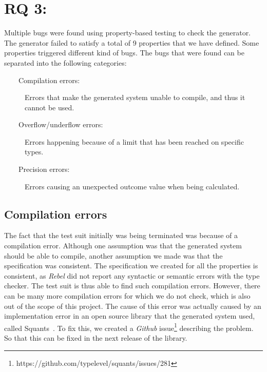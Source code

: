\section{RQ 3: \rqThree{}}
Multiple bugs were found using property-based testing to check the generator. The generator failed to satisfy a total of 9 properties that we have defined. Some properties triggered different kind of bugs. The bugs that were found can be separated into the following categories:
\begin{description}
  \item[~~~~Compilation errors:] Errors that make the generated system unable to compile, and thus it cannot be used.
  \item[~~~~Overflow/underflow errors:] Errors happening because of a limit that has been reached on specific types.
  \item[~~~~Precision errors:] Errors causing an unexpected outcome value when being calculated.
\end{description}
\subsection*{Compilation errors}
The fact that the test suit initially was being terminated was because of a compilation error. Although one assumption was that the generated system should be able to compile, another assumption we made was that the specification was consistent. The specification we created for all the properties is consistent, as \textit{Rebel} did not report any syntactic or semantic errors with the type checker. The test suit is thus able to find such compilation errors. However, there can be many more compilation errors for which we do not check, which is also out of the scope of this project. The cause of this error was actually caused by an implementation error in an open source library that the generated system used, called Squants~\cite{siteSquants2017}. To fix this, we created a \textit{Github} issue\footnote{https://github.com/typelevel/squants/issues/281} describing the problem. So that this can be fixed in the next release of the library.

